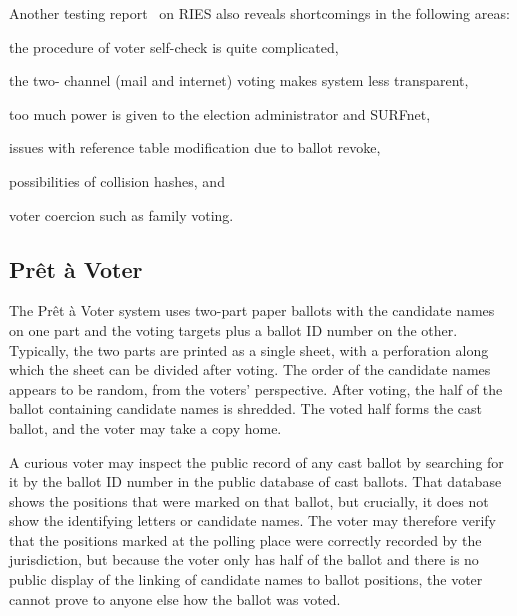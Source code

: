 Another testing report~\cite{hubbers2004} on RIES also reveals
shortcomings in the following areas:
\begin{enumerate*}
  \item the procedure of voter self-check is quite complicated,
  \item the two- channel (mail and internet) voting makes system less
    transparent,
  \item too much power is given to the election administrator and
    SURFnet,
  \item issues with reference table modification due to ballot revoke,
  \item possibilities of collision hashes, and
  \item voter coercion such as family voting.
\end{enumerate*}

\subsection{Prêt à Voter~\cite{chaum2005}}

The Prêt à Voter system uses two-part paper ballots with the candidate
names on one part and the voting targets plus a ballot ID number on
the other.  Typically, the two parts are printed as a single sheet,
with a perforation along which the sheet can be divided after voting.
The order of the candidate names appears to be random, from the
voters' perspective.  After voting, the half of the ballot containing
candidate names is shredded. The voted half forms the cast ballot, and
the voter may take a copy home.

A curious voter may inspect the public record of any cast ballot by
searching for it by the ballot ID number in the public database of
cast ballots.  That database shows the positions that were marked on
that ballot, but crucially, it does not show the identifying letters
or candidate names.  The voter may therefore verify that the positions
marked at the polling place were correctly recorded by the
jurisdiction, but because the voter only has half of the ballot and
there is no public display of the linking of candidate names to ballot
positions, the voter cannot prove to anyone else how the ballot was
voted.

